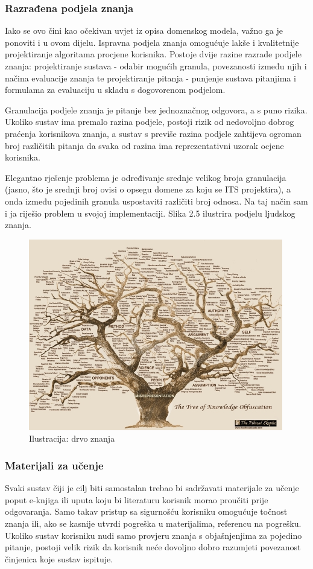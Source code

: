 \documentclass[times, utf8, zavrsni, numeric]{fer}
\begin{document}
\subsubsection{Razrađena podjela znanja}
Iako se ovo čini kao očekivan uvjet iz  opisa domenskog modela, važno ga je ponoviti i u ovom dijelu. Ispravna podjela znanja omogućuje lakše i kvalitetnije projektiranje algoritama procjene korisnika.\cite{knowledgerep} Postoje dvije razine razrade podjele znanja: projektiranje sustava - odabir mogućih granula, povezanosti između njih i načina evaluacije znanja te projektiranje pitanja - punjenje sustava pitanjima i formulama za evaluaciju u skladu s dogovorenom podjelom.
\par
Granulacija podjele znanja je pitanje bez jednoznačnog odgovora, a s puno rizika. Ukoliko sustav ima premalo razina podjele, postoji rizik od nedovoljno dobrog praćenja korisnikova znanja, a sustav s previše razina podjele zahtijeva ogroman broj različitih pitanja da svaka od razina ima reprezentativni uzorak ocjene korisnika.
\par
Elegantno rješenje problema je određivanje srednje velikog broja granulacija (jasno, što je srednji broj ovisi o opsegu domene za koju se ITS projektira), a onda između pojedinih granula uspostaviti različiti broj odnosa.\cite{sematicknowledge} Na taj način sam i ja riješio problem u svojoj implementaciji. Slika 2.5 ilustrira podjelu ljudskog znanja.

\begin{figure}[htb]
	\centering
	\includegraphics[]{img/drvo.jpg}
	\caption{Ilustracija: drvo znanja\cite{drvoznanja}}
	\label{fig:drvo}
\end{figure}

\subsubsection{Materijali za učenje}
Svaki sustav čiji je cilj biti samostalan trebao bi sadržavati materijale za učenje poput e-knjiga ili uputa koju bi literaturu korisnik morao proučiti prije odgovaranja. Samo takav pristup sa sigurnošću korisniku omogućuje točnost znanja ili, ako se kasnije utvrdi pogreška u materijalima, referencu na pogrešku. Ukoliko sustav korisniku nudi samo provjeru znanja s objašnjenjima za pojedino pitanje, postoji velik rizik da korisnik neće dovoljno dobro razumjeti povezanost činjenica koje sustav ispituje.
\end{document}
